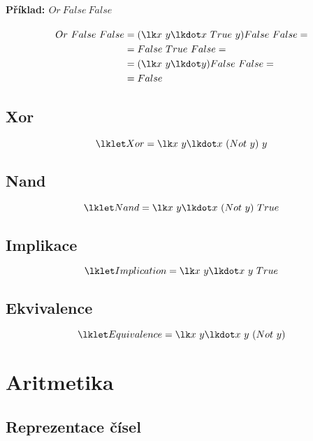 \paragraph*{Příklad: $Or ~ False ~ False$}
\begin{equation}
    \begin{split}
        Or ~ False ~ False &= (\lk x ~ y \lkdot x ~ True ~ y) False ~ False = \\
        &= False ~ True ~ False = \\
        &= (\lk x ~ y \lkdot y) False ~ False = \\
        &= False
    \end{split}
\end{equation}

\subsection{Xor}

$$ \lklet Xor = \lk x ~ y \lkdot x ~ (Not ~ y) ~ y $$

\subsection{Nand}

$$ \lklet Nand = \lk x ~ y \lkdot x ~ (Not ~ y) ~ True $$

\subsection{Implikace}

$$ \lklet Implication = \lk x ~ y \lkdot x ~ y ~ True $$

\subsection{Ekvivalence}

$$ \lklet Equivalence = \lk x ~ y \lkdot x ~ y ~ (Not ~ y) $$


\section{Aritmetika}

\subsection{Reprezentace čísel}

